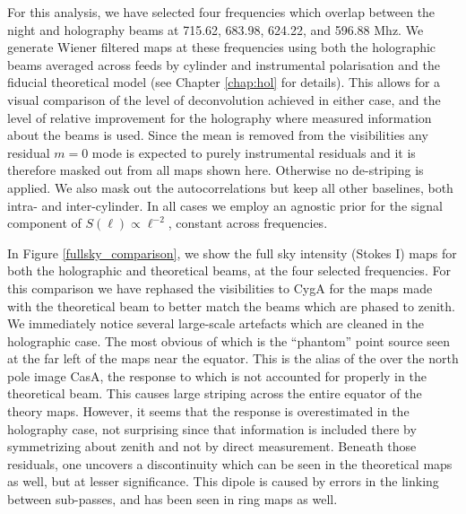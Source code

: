 For this analysis, we have selected four frequencies which overlap between the night and holography beams at 715.62, 683.98, 624.22, and 596.88 Mhz. We generate Wiener filtered maps at these frequencies using both the holographic beams averaged across feeds by cylinder and instrumental polarisation and the fiducial theoretical model (see Chapter \ref{chap:hol} for details). This allows for a visual comparison of the level of deconvolution achieved in either case, and the level of relative improvement for the holography where measured information about the beams is used. Since the mean is removed from the visibilities any residual $m=0$ mode is expected to purely instrumental residuals and it is therefore masked out from all maps shown here. Otherwise no de-striping is applied. We also mask out the autocorrelations but keep all other baselines, both intra- and inter-cylinder. In all cases we employ an agnostic prior for the signal component of $S(\ell) \propto \ell^{-2}$, constant across frequencies.

In Figure \ref{fullsky_comparison}, we show the full sky intensity (Stokes I) maps for both the holographic and theoretical beams, at the four selected frequencies.  For this comparison we have rephased the visibilities to CygA for the maps made with the theoretical beam to better match the beams which are phased to zenith. We immediately notice several large-scale artefacts which are cleaned in the holographic case. The most obvious of which is the ``phantom'' point source seen at the far left of the maps near the equator. This is the alias of the over the north pole image CasA, the response to which is not accounted for properly in the theoretical beam. This causes large striping across the entire equator of the theory maps. However, it seems that the response is overestimated in the holography case, not surprising since that information is included there by symmetrizing about zenith and not by direct measurement. Beneath those residuals, one uncovers a discontinuity which can be seen in the theoretical maps as well, but at lesser significance. This dipole is caused by errors in the linking between sub-passes, and has been seen in ring maps as well. 

